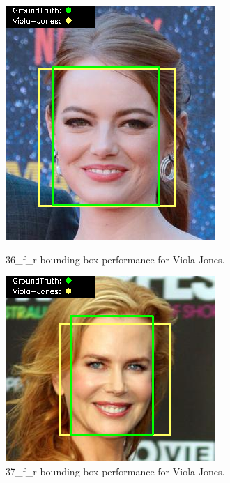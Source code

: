 \documentclass{l4proj}
\begin{document}
\begin{appendices}
\begin{figure}[h!]
  \centering
  \begin{minipage}{0.49\textwidth}
    \centering
     \includegraphics[width=\textwidth]{images/appendix/viola/36.png}
    \caption{36\_f\_r bounding box performance for Viola-Jones.}
    \label{whoopi_result}
  \end{minipage}
    \hfill
    \begin{minipage}{0.49\textwidth}
    \centering
     \includegraphics[width=\textwidth]{images/appendix/viola/37.png}
    \caption{37\_f\_r bounding box performance for Viola-Jones.}
    \label{whoopi_result}
  \end{minipage}
\end{figure}


\end{appendices}
\end{document}

